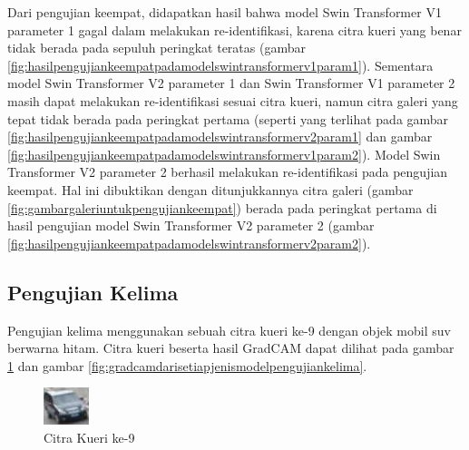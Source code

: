 Dari pengujian keempat, didapatkan hasil bahwa model Swin Transformer V1 parameter 1 gagal dalam melakukan re-identifikasi, 
karena citra kueri yang benar tidak berada pada sepuluh peringkat teratas (gambar 
\ref{fig:hasilpengujiankeempatpadamodelswintransformerv1param1}). Sementara model Swin Transformer V2 parameter 1 dan 
Swin Transformer V1 parameter 2 masih dapat melakukan re-identifikasi sesuai citra kueri, namun citra galeri yang tepat 
tidak berada pada peringkat pertama (seperti yang terlihat pada gambar \ref{fig:hasilpengujiankeempatpadamodelswintransformerv2param1} 
dan gambar \ref{fig:hasilpengujiankeempatpadamodelswintransformerv1param2}). Model Swin Transformer V2 parameter 2 berhasil 
melakukan re-identifikasi pada pengujian keempat. Hal ini dibuktikan dengan ditunjukkannya citra galeri 
(gambar \ref{fig:gambargaleriuntukpengujiankeempat}) berada pada peringkat pertama di hasil pengujian model Swin Transformer 
V2 parameter 2 (gambar \ref{fig:hasilpengujiankeempatpadamodelswintransformerv2param2}).\\

\subsection{Pengujian Kelima}

Pengujian kelima menggunakan sebuah citra kueri ke-9 dengan objek mobil suv berwarna hitam. Citra kueri 
beserta hasil GradCAM dapat dilihat pada gambar \ref{fig:gambarkueriuntukpengujiankelima} dan gambar 
\ref{fig:gradcamdarisetiapjenismodelpengujiankelima}.

\begin{figure}[h!]
  \centering
  \includegraphics[scale=1]{gambar/Que9_1019.jpg}
  \caption{Citra Kueri ke-9}
  \label{fig:gambarkueriuntukpengujiankelima}
\end{figure}

